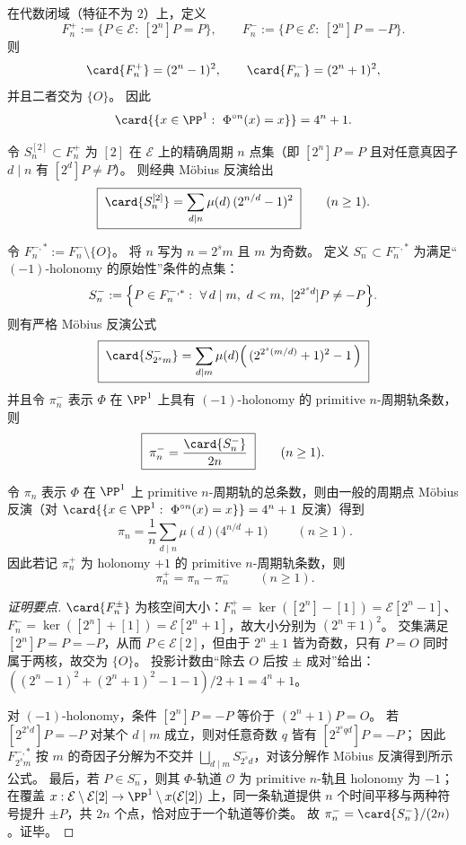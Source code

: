 \begin{conclusion}\label{con:xi-terminal-zm-lattes-primitive-orbit-counting-minus}
在代数闭域（特征不为 \(2\)）上，定义
\[
F_n^{+}:=\{P\in\mathcal{E}:\ [2^{n}]P=P\},\qquad
F_n^{-}:=\{P\in\mathcal{E}:\ [2^{n}]P=-P\}.
\]
则
\[
\card{F_n^{+}}=(2^{n}-1)^{2},\qquad
\card{F_n^{-}}=(2^{n}+1)^{2},
\]
并且二者交为 \(\{O\}\)。
因此
\[
\card{\{x\in\PP^{1}:\ \Phi^{\circ n}(x)=x\}}=4^{n}+1.
\]
\par
令 \(S_n^{[2]}\subset F_n^{+}\) 为 \([2]\) 在 \(\mathcal{E}\) 上的精确周期 \(n\) 点集（即 \([2^{n}]P=P\) 且对任意真因子 \(d\mid n\) 有 \([2^{d}]P\neq P\)）。
则经典 Möbius 反演给出
\[
\boxed{\;
\card{S_n^{[2]}}
=\sum_{d\mid n}\mu(d)\,(2^{n/d}-1)^{2}\;}
\qquad(n\ge 1).
\]
\par
令
\(
F_n^{-,*}:=F_n^{-}\setminus\{O\}
\)。
将 \(n\) 写为 \(n=2^{s}m\) 且 \(m\) 为奇数。
定义 \(S_{n}^{-}\subset F_n^{-,*}\) 为满足“\((-1)\)-holonomy 的原始性”条件的点集：
\[
S_{n}^{-}:=\Bigl\{P\in F_n^{-,*}:\ \forall\,d\mid m,\ d<m,\ [2^{2^{s}d}]P\neq -P\Bigr\}.
\]
则有严格 Möbius 反演公式
\[
\boxed{\;
\card{S_{2^{s}m}^{-}}
=\sum_{d\mid m}\mu(d)\Bigl(\,(2^{2^{s}(m/d)}+1)^{2}-1\,\Bigr)\;}
\]
并且令 \(\pi_n^{-}\) 表示 \(\Phi\) 在 \(\PP^{1}\) 上具有 \((-1)\)-holonomy 的 primitive \(n\)-周期轨条数，则
\[
\boxed{\;
\pi_n^{-}=\frac{\card{S_n^{-}}}{2n}\;}
\qquad(n\ge 1).
\]
\par
令 \(\pi_n\) 表示 \(\Phi\) 在 \(\PP^{1}\) 上 primitive \(n\)-周期轨的总条数，则由一般的周期点 Möbius 反演（对 \(\card{\{x\in\PP^{1}:\ \Phi^{\circ n}(x)=x\}}=4^n+1\) 反演）得到
\[
\boxed{\;
\pi_n=\frac{1}{n}\sum_{d\mid n}\mu(d)\bigl(4^{n/d}+1\bigr)\;}
\qquad(n\ge 1).
\]
因此若记 \(\pi_n^{+}\) 为 holonomy \(+1\) 的 primitive \(n\)-周期轨条数，则
\[
\boxed{\;
\pi_n^{+}=\pi_n-\pi_n^{-}\;}
\qquad(n\ge 1).
\]
\end{conclusion}
\begin{proof}[证明要点]
\(\card{F_n^{\pm}}\) 为核空间大小：\(F_n^{+}=\ker([2^{n}]-[1])=\mathcal{E}[2^{n}-1]\)、\(F_n^{-}=\ker([2^{n}]+[1])=\mathcal{E}[2^{n}+1]\)，故大小分别为 \((2^{n}\mp 1)^2\)。
交集满足 \([2^{n}]P=P=-P\)，从而 \(P\in\mathcal{E}[2]\)，但由于 \(2^{n}\pm 1\) 皆为奇数，只有 \(P=O\) 同时属于两核，故交为 \(\{O\}\)。
投影计数由“除去 \(O\) 后按 \(\pm\) 成对”给出：
\(
((2^{n}-1)^{2}+(2^{n}+1)^{2}-1-1)/2+1=4^{n}+1
\)。
\par
对 \((-1)\)-holonomy，条件 \([2^{n}]P=-P\) 等价于 \((2^{n}+1)P=O\)。
若 \([2^{2^{s}d}]P=-P\) 对某个 \(d\mid m\) 成立，则对任意奇数 \(q\) 皆有 \([2^{2^{s}qd}]P=-P\)；
因此 \(F_{2^{s}m}^{-,*}\) 按 \(m\) 的奇因子分解为不交并 \(\bigsqcup_{d\mid m}S_{2^{s}d}^{-}\)，对该分解作 Möbius 反演得到所示公式。
最后，若 \(P\in S_n^{-}\)，则其 \(\Phi\)-轨道 \(\mathcal{O}\) 为 primitive \(n\)-轨且 holonomy 为 \(-1\)；
在覆盖 \(x:\mathcal{E}\setminus\mathcal{E}[2]\to\PP^{1}\setminus x(\mathcal{E}[2])\) 上，同一条轨道提供 \(n\) 个时间平移与两种符号提升 \(\pm P\)，共 \(2n\) 个点，恰对应于一个轨道等价类。
故 \(\pi_n^{-}=\card{S_n^{-}}/(2n)\)。证毕。
\end{proof}

